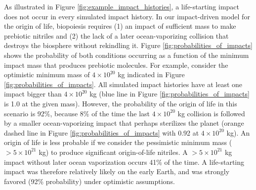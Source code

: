 \documentclass[manuscript]{aastex63}
\begin{document}
As illustrated in Figure \ref{fig:example_impact_histories}, a life-starting impact does not occur in every simulated impact history. In our impact-driven model for the origin of life, biopoiesis requires (1) an impact of sufficient mass to make prebiotic nitriles and (2) the lack of a later ocean-vaporizing collision that destroys the biosphere without rekindling it. Figure \ref{fig:probabilities_of_impacts} shows the probability of both conditions occurring as a function of the minimum impact mass that produces prebiotic molecules. For example, consider the \citet{Wogan_2023} optimistic minimum mass of $4 \times 10^{20}$ kg indicated in Figure \ref{fig:probabilities_of_impacts}. All simulated impact histories have at least one impact bigger than $4 \times 10^{20}$ kg (blue line in Figure \ref{fig:probabilities_of_impacts} is 1.0 at the given mass). However, the probability of the origin of life in this scenario is 92\%, because 8\% of the time the last $4 \times 10^{20}$ kg collision is followed by a smaller ocean-vaporizing impact that perhaps sterilizes the planet (orange dashed line in Figure \ref{fig:probabilities_of_impacts} with 0.92 at $4 \times 10^{20}$ kg). An origin of life is less probable if we consider the \citet{Wogan_2023} pessimistic minimum mass ($> 5 \times 10^{21}$ kg) to produce significant origin-of-life nitriles. A $> 5 \times 10^{21}$ kg impact without later ocean vaporization occurs 41\% of the time. A life-starting impact was therefore relatively likely on the early Earth, and was strongly favored (92\% probability) under optimistic assumptions.
\end{document}
